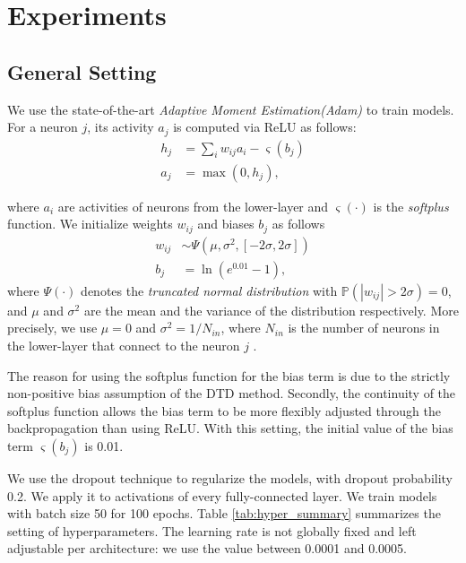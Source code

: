 \chapter{Experiments} \label{cha:chapter4}

\section{General Setting}\label{sec:setup}
 
 We use the state-of-the-art \textit{Adaptive Moment Estimation(Adam)} \citep{KingmaAdamMethodStochastic2014} to train models. For a neuron $j$, its activity $a_j$ is computed via ReLU as follows:
\begin{align*}
h_j &= \sum_{i} w_{ij} a_i - \varsigma(b_j)
\\
a_j &= \max(0, h_j),
\end{align*}

where $a_i$ are activities of neurons from the lower-layer and $\varsigma(\cdot)$ is the \textit{softplus} function. We initialize weights $w_{ij}$ and biases $b_{j}$ as follows
\begin{align*}
	w_{ij} &\sim \Psi( \mu, \sigma^2, [-2\sigma, 2\sigma]) \\
	b_{j} &= \ln(e^{0.01} - 1),
\end{align*}
where  $\Psi(\cdot)$ denotes the \textit{truncated normal distribution} with $\mathbb{P}(|w_{ij}| > 2\sigma) = 0$, and $\mu$ and $\sigma^2$ are the mean and the variance of the distribution respectively. More precisely, we use $\mu=0$ and $\sigma^2 = 1/N_{in}$, where $N_{in}$ is the number of neurons in the lower-layer that connect to the neuron $j$  \citep{GlorotUnderstandingdifficultytraining2010}.

The reason for using the softplus function for the bias term is due to the strictly non-positive bias assumption of the DTD method. Secondly, the continuity of the softplus function allows the bias term to be more flexibly adjusted through the backpropagation than using ReLU. With this setting, the initial value of the bias term  $\varsigma(b_j)$ is 0.01.

We use the dropout technique \citep{SrivastavaDropoutSimpleWay2014} to regularize the models, with dropout probability 0.2.  We apply it to activations of every fully-connected layer. We train models with batch size 50 for 100 epochs. Table \ref{tab:hyper_summary} summarizes the setting of hyperparameters. The learning rate is not globally fixed and left adjustable per architecture: we use the value between 0.0001 and 0.0005.


